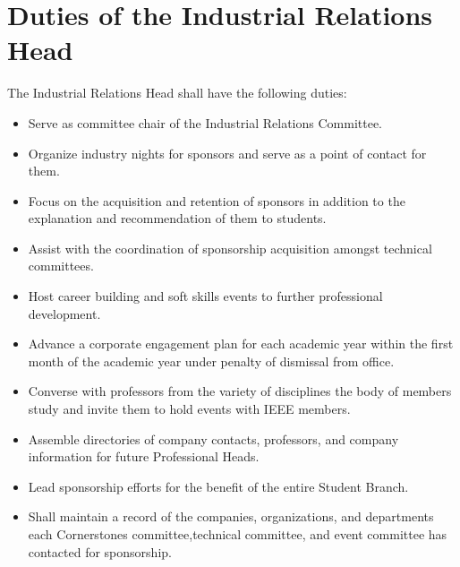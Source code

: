 \documentclass[12pt]{constitution}
\begin{document}
\section{Duties of the Industrial Relations Head}
\label{sec:officer_prof}
The Industrial Relations Head shall have the following duties:
\begin{itemize}
    \item Serve as committee chair of the Industrial Relations Committee.
    \item Organize industry nights for sponsors and serve as a point of contact for them.
    \item Focus on the acquisition and retention of sponsors in addition to the explanation and recommendation of them to students.
    \item Assist with the coordination of sponsorship acquisition amongst technical committees. 
    \item Host career building and soft skills events to further professional development.
    \item Advance a corporate engagement plan for each academic year within the first month of the academic year under penalty of dismissal from office.
    \item Converse with professors from the variety of disciplines the body of members study and invite them to hold events with IEEE members.
    \item Assemble directories of company contacts, professors, and company information for future Professional Heads.
	\item Lead sponsorship efforts for the benefit of the entire Student Branch.
    \item Shall maintain a record of the companies, organizations, and departments each Cornerstones committee,technical committee, and event committee has contacted for sponsorship.
\end{itemize}
\end{document}
